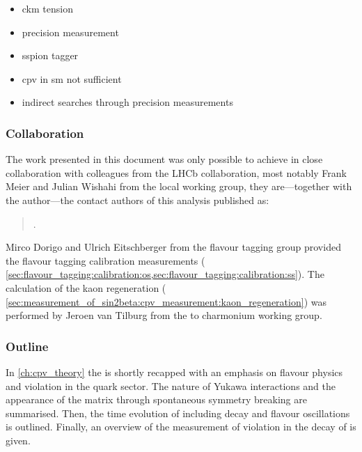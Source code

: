 \begin{itemize}
  \item ckm tension
  \item precision measurement
  \item sspion tagger
  \item cpv in sm not sufficient
  \item indirect searches through precision measurements
\end{itemize}

\subsubsection*{Collaboration}
The work presented in this document was only possible to achieve in close
collaboration with colleagues from the \acs{LHCb} collaboration, most notably
Frank Meier and Julian Wishahi from the local working group, they are---together
with the author---the contact authors of this analysis published as:
%
\begin{quotation}
  .
\end{quotation}

Mirco Dorigo and Ulrich Eitschberger from the flavour tagging group provided the
flavour tagging calibration measurements (\cf
\cref{sec:flavour_tagging:calibration:os,sec:flavour_tagging:calibration:ss}).
The calculation of the kaon regeneration (\cf
\cref{sec:measurement_of_sin2beta:cpv_measurement:kaon_regeneration}) was
performed by Jeroen van Tilburg from the \B to charmonium working group.

\subsubsection*{Outline}

In \cref{ch:cpv_theory} the \SM is shortly recapped with an emphasis on flavour
physics and \CP violation in the quark sector. The nature of Yukawa
interactions and the appearance of the \CKM matrix through spontaneous symmetry
breaking are summarised. Then, the time evolution of \Bmesons including decay
and flavour oscillations is outlined. Finally, an overview of the measurement of
\CP violation in the decay of \BdToJpsiKS is given.

